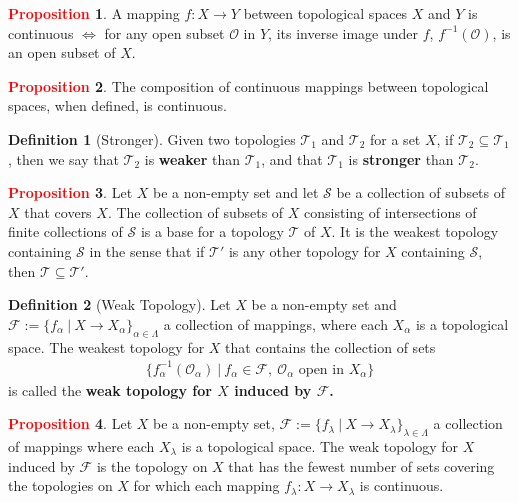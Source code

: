 \documentclass[11pt]{article}
\newcommand{\open}[0]{\mathcal{O}}
\newcommand{\topo}[0]{\mathcal{T}}
\theoremstyle{definition}
\theoremstyle{definition}
\theoremstyle{definition}
\newtheorem{definition}{\textcolor{OliveGreen}{Definition}}
\newtheorem{prop}{\textcolor{red}{Proposition}}
\theoremstyle{remark}
\begin{document}
\begin{prop}
	A mapping $f: X \rightarrow Y$ between topological spaces $X$ and $Y$ is continuous $\iff$ for any open subset $\open$ in $Y$, its inverse image under $f$, $f^{-1}(\open)$, is an open subset of $X$. 
\end{prop}

\begin{prop}
	The composition of continuous mappings between topological spaces, when defined, is continuous. 
\end{prop}

\begin{definition}[Stronger]
	Given two topologies $\topo_1$ and $\topo_2$ for a set $X$, if $\topo_2 \subseteq \topo_1$, then we say that $\topo_2$ is \textbf{weaker} than $\topo_1$, and that $\topo_1$ is \textbf{stronger} than $\topo_2$. 
\end{definition}

\begin{prop}
	Let $X$ be a non-empty set and let $\mathcal{S}$ be a collection of subsets of $X$ that covers $X$. The collection of subsets of $X$ consisting of intersections of finite collections of $\mathcal{S}$ is a base for a topology $\topo$ of $X$. It is the weakest topology containing $\mathcal{S}$ in the sense that if $\topo'$ is any other topology for $X$ containing $\mathcal{S}$, then $\topo \subseteq \topo'$. 
\end{prop}

\begin{definition}[Weak Topology]
	Let $X$ be a non-empty set and $\mathcal{F} := \{ f_\alpha\ |\ X \rightarrow X_\alpha \}_{\alpha \in \Lambda }$ a collection of mappings, where each $X_\alpha$ is a topological space. The weakest topology for $X$ that contains the collection of sets
	\begin{align}
		\{ f_\alpha^{-1} ( \open_\alpha)\ |\ f_\alpha \in \mathcal{F},\ \open_\alpha \text{ open in } X_\alpha \} 
	\end{align}
	is called the \textbf{weak topology for $X$ induced by $\mathcal{F}$.}
\end{definition}

\begin{prop} Let $X$ be a non-empty set, $\mathcal{F} := \{ f_\lambda\ |\ X \rightarrow X_\lambda \}_{\lambda \in \Lambda } $ a collection of mappings where each $X_\lambda$ is a topological space. The weak topology for $X$ induced by $\mathcal{F}$ is the topology on $X$ that has the fewest number of sets covering the topologies on $X$ for which each mapping $f_\lambda: X \rightarrow X_\lambda$ is continuous. 
\end{prop}
\end{document}
